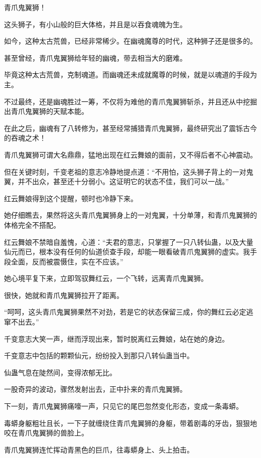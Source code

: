 
\begin{this_body}

青爪鬼翼狮！

这头狮子，有小山般的巨大体格，并且是以吞食魂魄为生。

如今，这种太古荒兽，已经非常稀少。在幽魂魔尊的时代，这种狮子还是很多的。

甚至曾经，青爪鬼翼狮给年轻的幽魂，带去相当大的磨难。

毕竟这种太古荒兽，克制魂道。而幽魂还未成就魔尊的时候，就是以魂道的手段为主。

不过最终，还是幽魂胜过一筹，不仅将为难他的青爪鬼翼狮斩杀，并且还从中挖掘出青爪鬼翼狮的天赋本能。

在此之后，幽魂有了八转修为，甚至经常捕猎青爪鬼翼狮，最终研究出了震铄古今的吞魂之术！

青爪鬼翼狮可谓大名鼎鼎，猛地出现在红云舞娘的面前，又不得后者不心神震动。

但在关键时刻，千变老祖的意志冷静地提点道：“不用怕，这头狮子背上的一对鬼翼，并不出众，甚至还十分弱小。这证明它的状态不佳，我们可以一战。”

红云舞娘得到这个提醒，顿时也冷静下来。

她仔细瞧去，果然将这头青爪鬼翼狮身上的一对鬼翼，十分单薄，和青爪鬼翼狮的体格完全不搭配。

红云舞娘不禁暗自羞愧，心道：“夫君的意志，只掌握了一只八转仙蛊，以及大量仙元而已，根本没有任何的仙道侦查手段，却能一眼看破青爪鬼翼狮的虚实。我手段全面，反而被震慑住，实在不应该。”

她心境平复下来，立即驾驭舞红云，一个飞转，远离青爪鬼翼狮。

很快，她就和青爪鬼翼狮拉开了距离。

“呵呵，这头青爪鬼翼狮果然不对劲，若是它的状态保留三成，你的舞红云必定逃窜不出去。”

千变意志大笑一声，继而浮现出来，暂时脱离红云舞娘，站在她的身边。

千变意志中包括的颗颗仙元，纷纷投入到那只八转仙蛊当中。

仙蛊气息在陡然间，变得浓郁无比。

一股奇异的波动，骤然发射出去，正中扑来的青爪鬼翼狮。

下一刻，青爪鬼翼狮痛嚎一声，只见它的尾巴忽然变化形态，变成一条毒蟒。

毒蟒身躯粗壮且长，一下子就缠绕住青爪鬼翼狮的身躯，带着剧毒的牙齿，狠狠地咬在青爪鬼翼狮的兽脸上。

青爪鬼翼狮连忙挥动青黑色的巨爪，往毒蟒身上、头上拍击。


\end{this_body}
